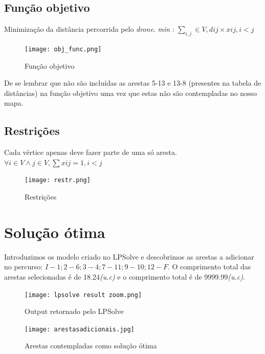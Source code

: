 \documentclass[runningheads]{llncs}
\begin{document}
\subsection{Função objetivo}
Minimização da distância percorrida pelo \textit{drone}.
\newline \textit{min} : $\sum_{i,j}^{} \in V,  dij  \times    xij,  i < j$

\begin{figure}[h]
\centering
\texttt{[image: obj\_func.png]}
\caption{Função objetivo} 
\label{fig:data5}
\end{figure}

\bigskip
De se lembrar que não são incluídas as arestas 5-13 e 13-8 (presentes na tabela de distâncias) na função objetivo uma vez que estas não são contempladas no nosso mapa.

\newpage
\subsection{Restrições}
Cada vértice apenas deve fazer parte de uma só aresta.
\newline $\forall i \in V \wedge  j \in V,  \sum xij = 1, i < j$

\begin{figure}[h]
\centering
\texttt{[image: restr.png]}
\caption{Restrições} 
\label{fig:data6}
\end{figure}


\newpage

\section{Solução ótima}
Introduzimos os modelo criado no LPSolve e descobrimos as arestas a adicionar no
percurso: $I-1; 2-6; 3-4; 7-11; 9-10; 12-F$. O comprimento total das arestas selecionadas é de 18.24\textit{(u.c)} e o comprimento total é de 9999.99\textit{(u.c)}.

\begin{figure}[ht]
\centering
\texttt{[image: lpsolve result zoom.png]}
\caption{Output retornado pelo LPSolve} 
\label{fig:data7}
\end{figure}

\begin{figure}[ht]
\centering
\texttt{[image: arestasadicionais.jpg]}
\caption{Arestas contempladas como solução ótima} 
\label{fig:data8}
\end{figure}

\newpage


\clearpage
\end{document}
